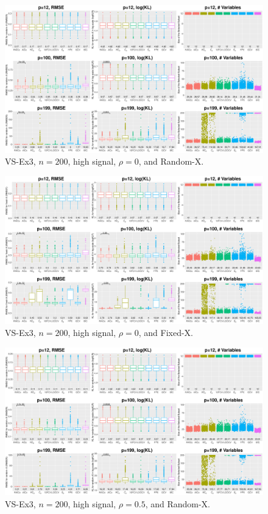 \clearpage
\begin{figure}[!ht]
\centering
\includegraphics[width=\textwidth]{figures/supplement/randomx_VS-Ex3_n200_hsnr_rho0.eps}
\caption{VS-Ex3, $n=200$, high signal, $\rho=0$, and Random-X.}
\end{figure}
\begin{figure}[!ht]
\centering
\includegraphics[width=\textwidth]{figures/supplement/fixedx_VS-Ex3_n200_hsnr_rho0.eps}
\caption{VS-Ex3, $n=200$, high signal, $\rho=0$, and Fixed-X.}
\end{figure}
\clearpage
\begin{figure}[!ht]
\centering
\includegraphics[width=\textwidth]{figures/supplement/randomx_VS-Ex3_n200_hsnr_rho05.eps}
\caption{VS-Ex3, $n=200$, high signal, $\rho=0.5$, and Random-X.}
\end{figure}
